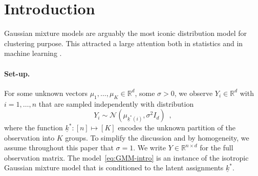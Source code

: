 \documentclass{article}
\newcommand{\alex}[1]{\textcolor{magenta}{[alex: #1]}}
\begin{document}

\section{Introduction}


Gaussian mixture models are arguably the most iconic distribution model for clustering purpose. This attracted a large attention both in statistics and in machine learning
\cite{
Dasgupta99,
VEMPALA2004,
LuZhou2016,
diakonikolas2018list,
Regev2017,giraud2019partial,
fei2018hidden,chen2021hanson,Kwon20,SegolNadler2021,romanov2022,LiuLi2022,diakonikolasCOLT23b,Even24}.


\paragraph{Set-up.}
For some unknown vectors $\mu_1,\ldots,\mu_K\in\mathbb{R}^d$, some  $\sigma>0$, we observe   $Y_{i}\in \mathbb{R}^d$ with $i=1,\ldots, n$ that are sampled independently with distribution
\begin{equation}\label{eq:GMM-intro}
Y_{i} \sim \mathcal{N}(\mu_{\underline{k}^*(i)},\sigma^2 I_d)\enspace ,
\end{equation}
where the function $\underline{k}^*:[n]\mapsto [K]$ encodes the unknown partition of the observation into $K$ groups. To simplify the discussion and by homogeneity, we assume throughout this paper that $\sigma=1$. We write $Y\in \mathbb{R}^{n\times d}$ for the full observation matrix. The model~\eqref{eq:GMM-intro} is an instance of the isotropic Gaussian mixture model that is conditioned to the latent assignments $\underline{k}^*$. 
\end{document}
